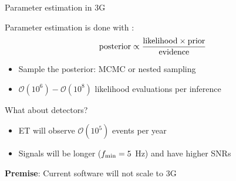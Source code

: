 \documentclass[usenames,dvipsnames,t]{beamer}
\begin{document}
\begin{frame}{Parameter estimation in 3G}
  \def\x{3mm}
  \def\y{5mm}

  Parameter estimation is done with :
  \begin{equation*}
    \rm{posterior} \propto \frac{\rm{likelihood} \times \rm{prior}}{\rm{evidence}}
  \end{equation*}

  \begin{itemize}
    \item Sample the posterior: MCMC or nested sampling

    \item $\mathcal{O}(10^6) - \mathcal{O}(10^8)$ likelihood evaluations per inference
  \end{itemize}
  
  \pause
  \vspace{\y}
  
  What about  detectors?
  \begin{itemize}
    \item ET will observe $\mathcal{O}(10^5)$ events per year
    
    \item Signals will be longer ($f_{\rm{min}} = 5$ Hz) and have higher SNRs
  \end{itemize}

  \pause
  \vspace{\y}

  \begin{tcolorbox}[colback=blue!10, boxrule=0pt]
    \textbf{Premise}: Current software will not scale to 3G~\cite{Hu:2024mvn}
  \end{tcolorbox}

\end{frame}
\end{document}
